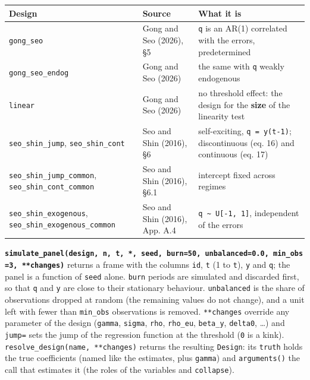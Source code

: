 \documentclass[
  10.5pt,
  a4paper,
]{article}
\newcounter{none} %
\begin{document}
{\def\LTcaptype{none} %
\begin{longtable}[]{@{}
  >{\raggedright\arraybackslash}p{}
  >{\raggedright\arraybackslash}p{}
  >{\raggedright\arraybackslash}p{}@{}}
\toprule\noalign{}
\begin{minipage}[b]{\linewidth}\raggedright
Design
\end{minipage} & \begin{minipage}[b]{\linewidth}\raggedright
Source
\end{minipage} & \begin{minipage}[b]{\linewidth}\raggedright
What it is
\end{minipage} \\
\midrule\noalign{}
\endhead
\bottomrule\noalign{}
\endlastfoot
\texttt{gong\_seo} & Gong and Seo (2026), §5 & \texttt{q} is an AR(1)
correlated with the errors, predetermined \\
\texttt{gong\_seo\_endog} & Gong and Seo (2026) & the same with
\texttt{q} weakly endogenous \\
\texttt{linear} & Gong and Seo (2026) & no threshold effect: the design
for the \textbf{size} of the linearity test \\
\texttt{seo\_shin\_jump}, \texttt{seo\_shin\_cont} & Seo and Shin
(2016), §6 & self-exciting, \texttt{q\ =\ y(t-1)}; discontinuous (eq.
16) and continuous (eq. 17) \\
\texttt{seo\_shin\_jump\_common}, \texttt{seo\_shin\_cont\_common} & Seo
and Shin (2016), §6.1 & intercept fixed across regimes \\
\texttt{seo\_shin\_exogenous}, \texttt{seo\_shin\_exogenous\_common} &
Seo and Shin (2016), App. A.4 &
\texttt{q\ \textasciitilde{}\ U{[}-1,\ 1{]}}, independent of the
errors \\
\end{longtable}
}

\textbf{\texttt{simulate\_panel(design,\ n,\ t,\ *,\ seed,\ burn=50,\ unbalanced=0.0,\ min\_obs=3,\ **changes)}}
returns a frame with the columns \texttt{id}, \texttt{t} (1 to
\texttt{t}), \texttt{y} and \texttt{q}; the panel is a function of
\texttt{seed} alone. \texttt{burn} periods are simulated and discarded
first, so that \texttt{q} and \texttt{y} are close to their stationary
behaviour. \texttt{unbalanced} is the share of observations dropped at
random (the remaining values do not change), and a unit left with fewer
than \texttt{min\_obs} observations is removed. \texttt{**changes}
override any parameter of the design (\texttt{gamma}, \texttt{sigma},
\texttt{rho}, \texttt{rho\_eu}, \texttt{beta\_y}, \texttt{delta0},
\ldots) and \texttt{jump=} sets the jump of the regression function at
the threshold (\texttt{0} is a kink).
\texttt{resolve\_design(name,\ **changes)} returns the resulting
\texttt{Design}: its \texttt{truth} holds the true coefficients (named
like the estimates, plus \texttt{gamma}) and \texttt{arguments()} the
call that estimates it (the roles of the variables and
\texttt{collapse}).
\end{document}
